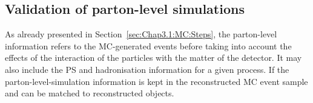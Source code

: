 


\subsection{Validation of parton-level simulations}
\label{sec:ChaptH:Sig:truth}
As already presented in Section~\ref{sec:Chap3.1:MC:Steps}, the parton-level 
information refers to the MC-generated events before taking into account
the effects of the interaction of the particles with the matter of the detector. It may also include
the PS and hadronisation information for a given process. If the parton-level-simulation information is kept in the 
reconstructed MC event sample and can be matched to reconstructed objects.

